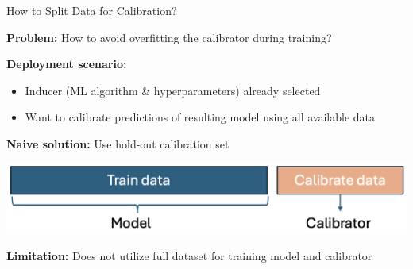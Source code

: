 \documentclass[11pt,compress,t,notes=noshow, xcolor=table]{beamer}
\begin{document}





\begin{frame}{How to Split Data for Calibration?  }%


\textbf{Problem:} How to avoid overfitting the calibrator during training?

\vspace{0.5em}
\textbf{Deployment scenario:} 
\begin{itemize}
  \item Inducer (ML algorithm \& hyperparameters) already selected
  \item Want to calibrate predictions of resulting model using all available data
\end{itemize}
\pause

\vspace{0.5em}
\textbf{Naive solution:} Use hold-out calibration set

\includegraphics[width=\linewidth]{figure_man/CalibWorkflow1.png}

\vspace{0.5em}
\textbf{Limitation:} Does not utilize full dataset for training model and calibrator

\vspace{0.5em}
\end{frame}
\end{document}
